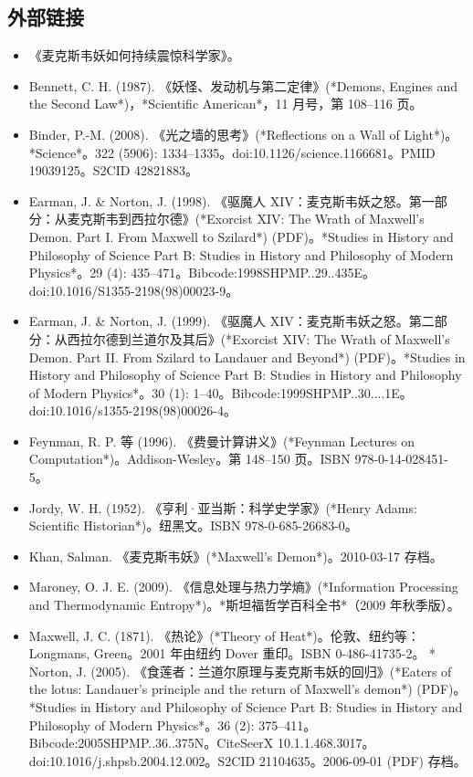 \subsection{外部链接}
\begin{itemize}
\item 《麦克斯韦妖如何持续震惊科学家》。
\item Bennett, C. H. (1987). 《妖怪、发动机与第二定律》(*Demons, Engines and the Second Law*)，*Scientific American*，11 月号，第 108–116 页。
\item Binder, P.-M. (2008). 《光之墙的思考》(*Reflections on a Wall of Light*)。*Science*。322 (5906): 1334–1335。doi:10.1126/science.1166681。PMID 19039125。S2CID 42821883。
\item Earman, J. & Norton, J. (1998). 《驱魔人 XIV：麦克斯韦妖之怒。第一部分：从麦克斯韦到西拉尔德》(*Exorcist XIV: The Wrath of Maxwell's Demon. Part I. From Maxwell to Szilard*) (PDF)。*Studies in History and Philosophy of Science Part B: Studies in History and Philosophy of Modern Physics*。29 (4): 435–471。Bibcode:1998SHPMP..29..435E。doi:10.1016/S1355-2198(98)00023-9。
\item Earman, J. & Norton, J. (1999). 《驱魔人 XIV：麦克斯韦妖之怒。第二部分：从西拉尔德到兰道尔及其后》(*Exorcist XIV: The Wrath of Maxwell's Demon. Part II. From Szilard to Landauer and Beyond*) (PDF)。*Studies in History and Philosophy of Science Part B: Studies in History and Philosophy of Modern Physics*。30 (1): 1–40。Bibcode:1999SHPMP..30....1E。doi:10.1016/s1355-2198(98)00026-4。
\item Feynman, R. P. 等 (1996). 《费曼计算讲义》(*Feynman Lectures on Computation*)。Addison-Wesley。第 148–150 页。ISBN 978-0-14-028451-5。
\item Jordy, W. H. (1952). 《亨利·亚当斯：科学史学家》(*Henry Adams: Scientific Historian*)。纽黑文。ISBN 978-0-685-26683-0。
\item Khan, Salman. 《麦克斯韦妖》(*Maxwell's Demon*)。2010-03-17 存档。
\item Maroney, O. J. E. (2009). 《信息处理与热力学熵》(*Information Processing and Thermodynamic Entropy*)。*斯坦福哲学百科全书*（2009 年秋季版）。
\item Maxwell, J. C. (1871). 《热论》(*Theory of Heat*)。伦敦、纽约等：Longmans, Green。2001 年由纽约 Dover 重印。ISBN 0-486-41735-2。
* Norton, J. (2005). 《食莲者：兰道尔原理与麦克斯韦妖的回归》(*Eaters of the lotus: Landauer's principle and the return of Maxwell's demon*) (PDF)。*Studies in History and Philosophy of Science Part B: Studies in History and Philosophy of Modern Physics*。36 (2): 375–411。Bibcode:2005SHPMP..36..375N。CiteSeerX 10.1.1.468.3017。doi:10.1016/j.shpsb.2004.12.002。S2CID 21104635。2006-09-01 (PDF) 存档。

\end{itemize}
